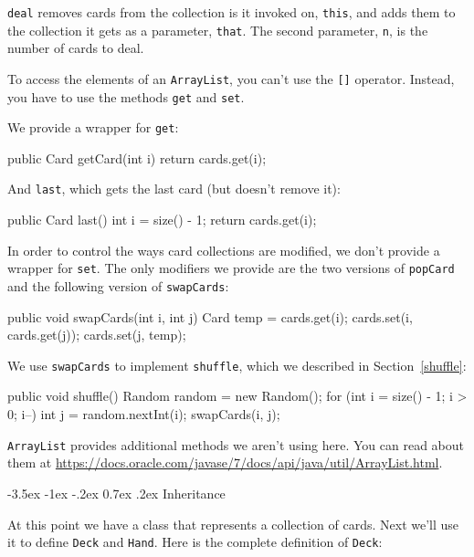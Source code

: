 \documentclass[12pt]{book}
\makeatletter
\theoremstyle{exercise}
\newcommand{\java}[1]{\verb"#1"}
\renewcommand{\section}{\@startsection{section}{1}{\z@}%
    {-3.5ex \@plus -1ex \@minus -.2ex}%
    {0.7ex \@plus.2ex}%
    {\normalfont\Large\bfseries}}
\newcommand{\java}[1]{\lstinline{#1}} %
\makeatother
\begin{document}
\java{deal} removes cards from the collection is it invoked on, \java{this}, and adds them to the collection it gets as a parameter, \java{that}.
The second parameter, \java{n}, is the number of cards to deal.

To access the elements of an \java{ArrayList}, you can't use the \java{[]} operator.
Instead, you have to use the methods \java{get} and \java{set}.

We provide a wrapper for \java{get}:

\begin{code}
    public Card getCard(int i) {
        return cards.get(i);
    }
\end{code}

And \java{last}, which gets the last card (but doesn't remove it):

\begin{code}
    public Card last() {
        int i = size() - 1;        
        return cards.get(i);
    }
\end{code}

In order to control the ways card collections are modified, we don't provide a wrapper for \java{set}.
The only modifiers we provide are the two versions of \java{popCard} and the following version of \java{swapCards}:

\begin{code}
    public void swapCards(int i, int j) {
        Card temp = cards.get(i);
        cards.set(i, cards.get(j));
        cards.set(j, temp);
    }
\end{code}

We use \java{swapCards} to implement \java{shuffle}, which we described in Section~\ref{shuffle}:

\begin{code}
    public void shuffle() {
        Random random = new Random();
        for (int i = size() - 1; i > 0; i--) {
            int j = random.nextInt(i);
            swapCards(i, j);
        }
    }
\end{code}

\java{ArrayList} provides additional methods we aren't using here.
You can read about them at \url{https://docs.oracle.com/javase/7/docs/api/java/util/ArrayList.html}.


\section{Inheritance}

At this point we have a class that represents a collection of cards.
Next we'll use it to define \java{Deck} and \java{Hand}.
Here is the complete definition of \java{Deck}:
\end{document}
